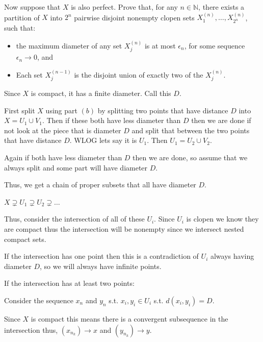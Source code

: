 \documentclass[12pt, letterpaper]{article}
\newcommand{\N}{\mathbb{N}}
\begin{document}
\begin{subproblem}{}
    Now suppose that $X$ is also perfect. Prove that, for any
    $n \in \N$, there exists a partition of $X$ into $2^n$ pairwise
    disjoint nonempty clopen sets $X^{(n)}_1, \ldots, X^{(n)}_{2^n}$,
    such that:
    \begin{itemize}
    \item the maximum diameter of any set $X^{(n)}_{j}$ is at most
      $\epsilon_n$, for some sequence $\epsilon_n \to 0$, and
    \item Each set $X^{(n-1)}_j$ is the disjoint union of exactly two
      of the $X^{(n)}_j$.
    \end{itemize}
\end{subproblem}
\begin{problemproof}
    Since $X$ is compact, it has a finite diameter. Call this $D$.
    
    First split $X$ using part $(b)$ by splitting two points that have distance $D$ into $X=U_1 \cup V_1$. Then if these both have less diameter than $D$ then we are done if not look at the piece that is diameter $D$ and split that between the two points that have distance $D$. WLOG lets say it is $U_1$. Then $U_1=U_2 \cup V_2$.

    Again if both have less diameter than $D$ then we are done, so assume that we always split and some part will have diameter $D$.

    Thus, we get a chain of proper subsets that all have diameter $D$.

    $X \supsetneq U_1 \supsetneq U_2 \supsetneq \dots$

    Thus, consider the intersection of all of these $U_i$. Since $U_i$ is clopen we know they are compact thus the intersection will be nonempty since we intersect nested compact sets.

    If the intersection has one point then this is a contradiction of $U_i$ always having diameter $D$, so we will always have infinite points.

    If the intersection has at least two points:

    Consider the sequence $x_n$ and $y_n$ s.t. $x_i,y_i \in U_i$ s.t. $d(x_i,y_i)=D$.

    Since $X$ is compact this means there is a convergent subsequence in the intersection thus, $(x_{n_k}) \to x$ and $(y_{n_k}) \to y$.

    
    
\end{problemproof}
\end{document}
